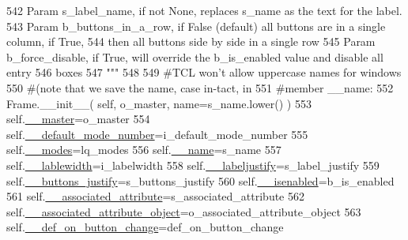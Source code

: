 \begin{DoxyCode}
542 \textcolor{stringliteral}{        Param s\_label\_name, if not None, replaces s\_name as the text for the label.}
543 \textcolor{stringliteral}{        Param b\_buttons\_in\_a\_row, if False (default) all buttons are in a single column, if True,}
544 \textcolor{stringliteral}{                then all buttons side by side in a single row}
545 \textcolor{stringliteral}{        Param b\_force\_disable, if True, will override the b\_is\_enabled value and disable all entry }
546 \textcolor{stringliteral}{              boxes}
547 \textcolor{stringliteral}{        """}
548 
549         \textcolor{comment}{#TCL won't allow uppercase names for windows}
550         \textcolor{comment}{#(note that we save the name, case in-tact, in}
551         \textcolor{comment}{#member \_\_name:}
552         Frame.\_\_init\_\_( self, o\_master, name=s\_name.lower() )
553         self.\hyperlink{classnegui_1_1pgguiutilities_1_1KeyCategoricalValueFrame_ad0cd6c8b8265cb6b27efa7bbc5e23ae0}{\_\_master}=o\_master
554         self.\hyperlink{classnegui_1_1pgguiutilities_1_1KeyCategoricalValueFrame_ae5f2855d8f22b4aa8f533023ac3e7fb4}{\_\_default\_mode\_number}=i\_default\_mode\_number
555         self.\hyperlink{classnegui_1_1pgguiutilities_1_1KeyCategoricalValueFrame_aadb3b6381c9159d303cd150e5a748096}{\_\_modes}=lq\_modes
556         self.\hyperlink{classnegui_1_1pgguiutilities_1_1KeyCategoricalValueFrame_a92a1947d6110ada3bd813cc8e84d84ad}{\_\_name}=s\_name
557         self.\hyperlink{classnegui_1_1pgguiutilities_1_1KeyCategoricalValueFrame_adf2c2370358ac051464aef108d75caa3}{\_\_lablewidth}=i\_labelwidth
558         self.\hyperlink{classnegui_1_1pgguiutilities_1_1KeyCategoricalValueFrame_a96cbcef967bddfd5035b827c0ae50c05}{\_\_labeljustify}=s\_label\_justify
559         self.\hyperlink{classnegui_1_1pgguiutilities_1_1KeyCategoricalValueFrame_a1fa18274aa53997c8b5fe446779b9a9d}{\_\_buttons\_justify}=s\_buttons\_justify
560         self.\hyperlink{classnegui_1_1pgguiutilities_1_1KeyCategoricalValueFrame_afb2be50b6de2bac5c96b9d73d93da416}{\_\_isenabled}=b\_is\_enabled
561         self.\hyperlink{classnegui_1_1pgguiutilities_1_1KeyCategoricalValueFrame_aa9b8f1b85890b51192559ff142d2360f}{\_\_associated\_attribute}=s\_associated\_attribute
562         self.\hyperlink{classnegui_1_1pgguiutilities_1_1KeyCategoricalValueFrame_a14174765fdf3479d1f7f09fe1deda5cf}{\_\_associated\_attribute\_object}=o\_associated\_attribute\_object
563         self.\hyperlink{classnegui_1_1pgguiutilities_1_1KeyCategoricalValueFrame_a0e462eacf72e4afb9711c917fe1c0d6a}{\_\_def\_on\_button\_change}=def\_on\_button\_change

\end{DoxyCode}
